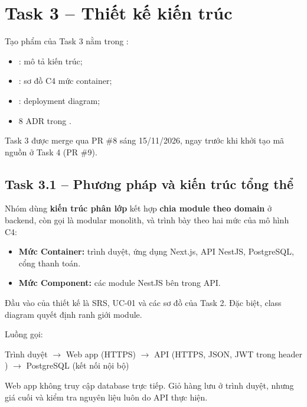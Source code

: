 \section{Task 3 -- Thiết kế kiến trúc}\label{ch:kientruc}

Tạo phẩm của Task 3 nằm trong :
\begin{itemize}
\item {}: mô tả kiến trúc;
\item {}: sơ đồ C4 mức container;
\item {}: deployment diagram;
\item 8 ADR trong .
\end{itemize}

Task 3 được merge qua PR \#8 sáng 15/11/2026, ngay trước khi khởi tạo mã nguồn ở Task 4 (PR \#9).

\subsection{Task 3.1 -- Phương pháp và kiến trúc tổng thể}
Nhóm dùng \textbf{kiến trúc phân lớp} kết hợp \textbf{chia module theo domain} ở backend, còn gọi là modular monolith, và trình bày theo hai mức của mô hình C4:
\begin{itemize}
\item \textbf{Mức Container:} trình duyệt, ứng dụng Next.js, API NestJS, PostgreSQL, cổng thanh toán.
\item \textbf{Mức Component:} các module NestJS bên trong API.
\end{itemize}

Đầu vào của thiết kế là SRS, UC-01 và các sơ đồ của Task 2. Đặc biệt, class diagram quyết định ranh giới module.




Luồng gọi:
\begin{center}
Trình duyệt $\rightarrow$ Web app (HTTPS) $\rightarrow$ API (HTTPS, JSON, JWT trong header ) $\rightarrow$ PostgreSQL (kết nối nội bộ)
\end{center}

Web app không truy cập database trực tiếp. Giỏ hàng lưu ở trình duyệt, nhưng giá cuối và kiểm tra nguyên liệu luôn do API thực hiện.


